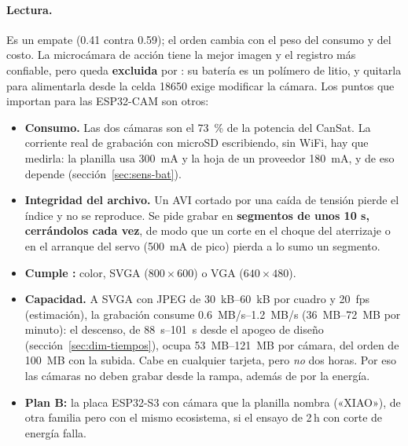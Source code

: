 \begin{table}[H]
\centering\small
\caption{Decisión de las cámaras.}\label{tab:sens-cam}

\end{table}

\paragraph{Lectura.} Es un empate (\num{0.41} contra \num{0.59}); el orden cambia con el peso del
consumo y del costo. La microcámara de acción tiene la mejor imagen y el registro más
confiable, pero queda \textbf{excluida} por : su batería es un polímero de litio, y
quitarla para alimentarla desde la celda 18650 exige modificar la cámara. Los
puntos que importan para las ESP32-CAM son otros:
\begin{itemize}[leftmargin=*]
  \item \textbf{Consumo.} Las dos cámaras son el \SI{73}{\percent} de la potencia del CanSat.
        La corriente real de grabación con microSD escribiendo, sin WiFi, hay que medirla: la
        planilla usa \SI{300}{mA} y la hoja de un proveedor \SI{180}{mA}\nv{}, y de eso depende
         (sección~\ref{sec:sens-bat}).
  \item \textbf{Integridad del archivo.} Un AVI cortado por una caída de tensión pierde el
        índice y no se reproduce. Se pide grabar en \textbf{segmentos de unos 10 s, cerrándolos
        cada vez}, de modo que un corte en el choque del aterrizaje o en el arranque del
        servo (\SI{500}{mA} de pico) pierda a lo sumo un segmento.
  \item \textbf{Cumple :} color, SVGA ($800\times600$) o VGA ($640\times480$).
  \item \textbf{Capacidad.} A SVGA con JPEG de \SIrange{30}{60}{kB} por cuadro y \SI{20}{fps}
        (estimación), la grabación consume \SIrange{0.6}{1.2}{MB/s} (\SIrange{36}{72}{MB} por
        minuto): el descenso, de \SIrange{88}{101}{s} desde el apogeo de diseño
        (sección~\ref{sec:dim-tiempos}), ocupa \SIrange{53}{121}{MB} por cámara, del orden de
        \SI{100}{MB} con la subida. Cabe en cualquier tarjeta, pero \emph{no} dos horas. Por eso
        las cámaras no deben grabar desde la rampa, además de por la energía.
  \item \textbf{Plan B:} la placa ESP32-S3 con cámara que la planilla nombra («XIAO»), de
        otra familia pero con el mismo ecosistema, si el ensayo de 2\,h con corte de energía
        falla.
\end{itemize}

